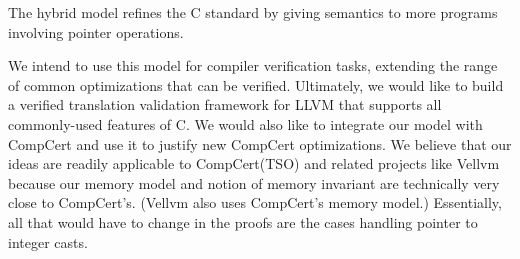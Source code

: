 The hybrid model refines the C standard by giving semantics to more programs involving pointer
operations.

We intend to use this model for compiler verification tasks, extending the range of
common optimizations that can be verified. Ultimately, we would like to build a verified translation
validation framework for LLVM that supports all commonly-used features of C. We would also like to
integrate our model with CompCert and use it to justify new CompCert optimizations.  We believe that
our ideas are readily applicable to CompCert(TSO) and related projects like
Vellvm~\cite{vellvm:popl12,vellvm:pldi13} because our memory model and notion of memory invariant
are technically very close to CompCert's. (Vellvm also uses CompCert's memory model.) Essentially,
all that would have to change in the proofs are the cases handling pointer to integer casts.







